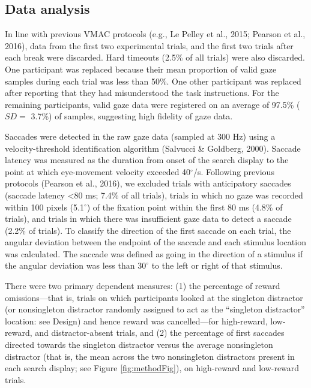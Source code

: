 \documentclass[man, a4paper, noextraspace, 11pt,floatsintext]{apa6}
\theoremstyle{definition}
\theoremstyle{definition}
\theoremstyle{definition}
\theoremstyle{remark}
\begin{document}
\subsection{Data analysis}\label{data-analysis}

In line with previous VMAC protocols (e.g., Le Pelley et al., 2015;
Pearson et al., 2016), data from the first two experimental trials, and
the first two trials after each break were discarded. Hard timeouts
(2.5\% of all trials) were also discarded. One participant was replaced
because their mean proportion of valid gaze samples during each trial
was less than 50\%. One other participant was replaced after reporting
that they had misunderstood the task instructions. For the remaining
participants, valid gaze data were registered on an average of 97.5\%
(\(SD=\) 3.7\%) of samples, suggesting high fidelity of gaze data.

Saccades were detected in the raw gaze data (sampled at 300 Hz) using a
velocity-threshold identification algorithm (Salvucci \& Goldberg,
2000). Saccade latency was measured as the duration from onset of the
search display to the point at which eye-movement velocity exceeded
40\(^\circ\)/s. Following previous protocols (Pearson et al., 2016), we
excluded trials with anticipatory saccades (saccade latency
\textless{}80 ms; 7.4\% of all trials), trials in which no gaze was
recorded within 100 pixels (5.1\(^\circ\)) of the fixation point within
the first 80 ms (4.8\% of trials), and trials in which there was
insufficient gaze data to detect a saccade (2.2\% of trials). To
classify the direction of the first saccade on each trial, the angular
deviation between the endpoint of the saccade and each stimulus location
was calculated. The saccade was defined as going in the direction of a
stimulus if the angular deviation was less than \(30^\circ\) to the left
or right of that stimulus.

There were two primary dependent measures: (1) the percentage of reward
omissions---that is, trials on which participants looked at the
singleton distractor (or nonsingleton distractor randomly assigned to
act as the \enquote{singleton distractor} location: see Design) and
hence reward was cancelled---for high-reward, low-reward, and
distractor-absent trials, and (2) the percentage of first saccades
directed towards the singleton distractor versus the average
nonsingleton distractor (that is, the mean across the two nonsingleton
distractors present in each search display; see Figure
\ref{fig:methodFig}), on high-reward and low-reward trials.
\end{document}
